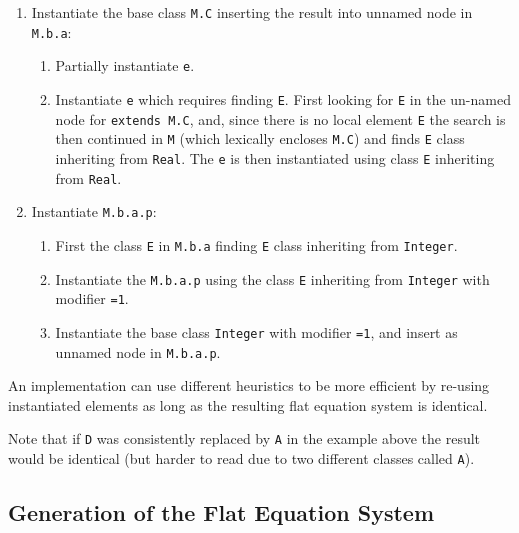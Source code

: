 \begin{example}
\begin{enumerate}
\begin{enumerate}
\begin{enumerate}
\begin{enumerate}
      \end{enumerate}
    \end{enumerate}
  \end{enumerate}
\item
  Instantiate the base class \lstinline!M.C! inserting the result into unnamed node in \lstinline!M.b.a!:
  \begin{enumerate}
  \item
    Partially instantiate \lstinline!e!.
  \item
    Instantiate \lstinline!e! which requires finding \lstinline!E!.
    First looking for \lstinline!E! in the un-named node for \lstinline!extends M.C!, and, since there is no local element \lstinline!E! the search is then continued in \lstinline!M! (which lexically encloses \lstinline!M.C!) and finds \lstinline!E! class inheriting from \lstinline!Real!.
    The \lstinline!e! is then instantiated using class \lstinline!E! inheriting from \lstinline!Real!.
  \end{enumerate}
\item
  Instantiate \lstinline!M.b.a.p!:
  \begin{enumerate}
  \item
    First the class \lstinline!E! in \lstinline!M.b.a! finding \lstinline!E! class inheriting from \lstinline!Integer!.
  \item
    Instantiate the \lstinline!M.b.a.p! using the class \lstinline!E! inheriting from \lstinline!Integer! with modifier \lstinline!=1!.
  \item
    Instantiate the base class \lstinline!Integer! with modifier \lstinline!=1!, and insert as unnamed node in \lstinline!M.b.a.p!.
  \end{enumerate}
\end{enumerate}

An implementation can use different heuristics to be more efficient by re-using instantiated elements as long as the resulting flat equation system is identical.

Note that if \lstinline!D! was consistently replaced by \lstinline!A! in the example above the result would be identical (but harder to read due to two different classes called \lstinline!A!).
\end{example}


\subsection{Generation of the Flat Equation System}\label{generation-of-the-flat-equation-system}

